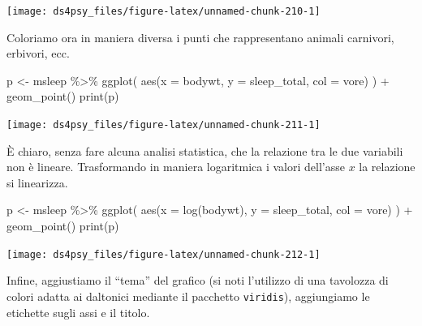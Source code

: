 \documentclass[
  11pt,
]{krantz}
\makeatletter
\newenvironment{Shaded}{\begin{snugshade}}{\end{snugshade}}
\newcommand{\AttributeTok}[1]{\textcolor[rgb]{0.61,0.61,0.61}{#1}}
\newcommand{\FunctionTok}[1]{\textcolor[rgb]{0,0,0}{#1}}
\newcommand{\NormalTok}[1]{#1}
\newcommand{\OtherTok}[1]{\textcolor[rgb]{0.37,0.37,0.37}{#1}}
\newcommand{\SpecialCharTok}[1]{\textcolor[rgb]{0,0,0}{#1}}
\newenvironment{kframe}{%
\medskip{}
\setlength{\fboxsep}{.8em}
 \def\at@end@of@kframe{}%
 \ifinner\ifhmode%
  \def\at@end@of@kframe{\end{minipage}}%
  \begin{minipage}{\columnwidth}%
 \fi\fi%
 \def\FrameCommand##1{\hskip\@totalleftmargin \hskip-\fboxsep
 \colorbox{shadecolor}{##1}\hskip-\fboxsep
     \hskip-\linewidth \hskip-\@totalleftmargin \hskip\columnwidth}%
 \MakeFramed {\advance\hsize-\width
   \@totalleftmargin\z@ \linewidth\hsize
   \@setminipage}}%
 {\par\unskip\endMakeFramed%
 \at@end@of@kframe}
\renewenvironment{Shaded}{\begin{kframe}}{\end{kframe}}
\theoremstyle{definition}
\theoremstyle{definition}
\theoremstyle{definition}
\theoremstyle{definition}
\theoremstyle{remark}
\makeatother
\begin{document}
\begin{center}\texttt{[image: ds4psy\_files/figure-latex/unnamed-chunk-210-1]} \end{center}

Coloriamo ora in maniera diversa i punti che rappresentano animali carnivori, erbivori, ecc.

\begin{Shaded}
\begin{Highlighting}[]
\NormalTok{p }\OtherTok{\textless{}{-}}\NormalTok{ msleep }\SpecialCharTok{\%\textgreater{}\%} 
  \FunctionTok{ggplot}\NormalTok{(}
    \FunctionTok{aes}\NormalTok{(}\AttributeTok{x =}\NormalTok{ bodywt, }\AttributeTok{y =}\NormalTok{ sleep\_total, }\AttributeTok{col =}\NormalTok{ vore)}
\NormalTok{  ) }\SpecialCharTok{+}
  \FunctionTok{geom\_point}\NormalTok{()}
\FunctionTok{print}\NormalTok{(p)}
\end{Highlighting}
\end{Shaded}

\begin{center}\texttt{[image: ds4psy\_files/figure-latex/unnamed-chunk-211-1]} \end{center}

È chiaro, senza fare alcuna analisi statistica, che la relazione tra le due variabili non è lineare. Trasformando in maniera logaritmica i valori dell'asse \(x\) la relazione si linearizza.

\begin{Shaded}
\begin{Highlighting}[]
\NormalTok{p }\OtherTok{\textless{}{-}}\NormalTok{ msleep }\SpecialCharTok{\%\textgreater{}\%} 
  \FunctionTok{ggplot}\NormalTok{(}
    \FunctionTok{aes}\NormalTok{(}\AttributeTok{x =} \FunctionTok{log}\NormalTok{(bodywt), }\AttributeTok{y =}\NormalTok{ sleep\_total, }\AttributeTok{col =}\NormalTok{ vore)}
\NormalTok{  ) }\SpecialCharTok{+}
  \FunctionTok{geom\_point}\NormalTok{()}
\FunctionTok{print}\NormalTok{(p)}
\end{Highlighting}
\end{Shaded}

\begin{center}\texttt{[image: ds4psy\_files/figure-latex/unnamed-chunk-212-1]} \end{center}

Infine, aggiustiamo il ``tema'' del grafico (si noti l'utilizzo di una tavolozza di colori adatta ai daltonici mediante il pacchetto \texttt{viridis}), aggiungiamo le etichette sugli assi e il titolo.
\end{document}
